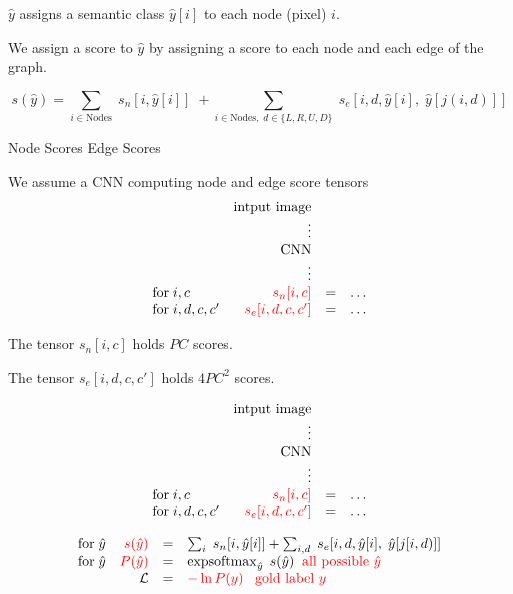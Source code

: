 {


$\hat{y} $ assigns a semantic class $\hat{y}[i]$ to each node (pixel) $i$.

\vfill
We assign a score to $\hat{y}$ by assigning a score to each node and each edge of the graph.

{\color{red} $$s(\hat{y}) = \sum_{i \in \mathrm{Nodes}}\; s_n[i,\hat{y}[i]]\; + \sum_{i \in \mathrm{Nodes},\;d \in \{L,R,U,D\}}\;s_e[i,d,\hat{y}[i],\;\hat{y}[j(i,d)]]$$}
\centerline{Node Scores \hspace{6em}Edge Scores \hspace{3em}~}



We assume a CNN computing {\color{red} node and edge score tensors}
\vfill
$$\begin{array}{lrcl}
& \mbox{intput image} \\
& \vdots \\
& \mbox{CNN} \\
& \vdots \\
\mathrm{for}\;i,c & \;{\color{red} s_n[i,c]} & = & \ldots \\
\mathrm{for}\;i,d,c,c' & {\color{red} s_e[i,d,c,c']} & = & \ldots \\
\end{array}$$

\vfill
The tensor {\color{red} $s_n[i,c]$} holds $PC$ scores.

\vfill
The tensor {\color{red} $s_e[i,d,c,c']$} holds $4PC^2$ scores.

$$\begin{array}{lrcl}
& \mbox{intput image} \\
& \vdots \\
& \mbox{CNN} \\
& \vdots \\
\mathrm{for}\;i,c & \;{\color{red} s_n[i,c]} & = & \ldots \\
\mathrm{for}\;i,d,c,c' & {\color{red} s_e[i,d,c,c']} & = & \ldots
\end{array}$$

\vfill
$$\begin{array}{lrcl}
\mbox{for}\;\hat{y} & {\color{red} s(\hat{y})} & = & \sum_i\;s_n[i,\hat{y}[i]] + \sum_{i,d}\;s_e[i,d,\hat{y}[i],\;\hat{y}[j[i,d)]] \\
\mbox{for}\;\hat{y} & {\color{red} P(\hat{y})} & = & \operatorname*{expsoftmax}_{\hat{y}}\;s(\hat{y}) \;\;\mbox{\color{red} all possible $\hat{y}$} \\
 & {\cal L} & = & {\color{red} - \ln P(y) \;\;\;\mbox{gold label $y$}}
\end{array}$$

}
